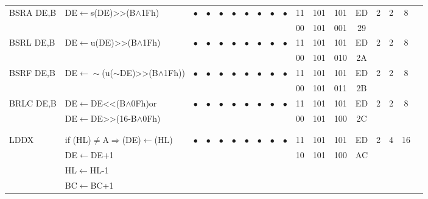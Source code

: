 \documentclass[oneside,a4paper]{book}
\newcommand{\instrt}{\rule{0pt}{2.7ex}}
\newcommand{\instrb}{\rule[-1.7ex]{0pt}{0pt}}
\begin{document}
{\begin{tabular}{llcccccccccccccccl}
		BSRA DE,B\instrt & 
			DE$\leftarrow$s(DE)>>(B$\wedge$1Fh)\footnotemark[2] & 
			$\bullet$ & 
				$\bullet$ & 
				$\bullet$ & 
				$\bullet$ & 
				$\bullet$ & 
				$\bullet$ & 
				$\bullet$ & 
				$\bullet$ & 
			11 & 101 & 101 & 
			ED & 2 & 
			2 & 8 & \\
			\multicolumn{10}{c}{} & 00 & 101 & 001 & 29 & \instrb \\

		BSRL DE,B\instrt & 
			DE$\leftarrow$u(DE)>>(B$\wedge$1Fh)\footnotemark[3] & 
			$\bullet$ & 
				$\bullet$ & 
				$\bullet$ & 
				$\bullet$ & 
				$\bullet$ & 
				$\bullet$ & 
				$\bullet$ & 
				$\bullet$ & 
			11 & 101 & 101 & 
			ED & 2 & 
			2 & 8 & \\
			\multicolumn{10}{c}{} & 00 & 101 & 010 & 2A & \instrb \\

		BSRF DE,B\instrt & 
			DE$\leftarrow\sim$(u($\sim$DE)>>(B$\wedge$1Fh))\footnotemark[4] & 
			$\bullet$ & 
				$\bullet$ & 
				$\bullet$ & 
				$\bullet$ & 
				$\bullet$ & 
				$\bullet$ & 
				$\bullet$ & 
				$\bullet$ & 
			11 & 101 & 101 & 
			ED & 2 & 
			2 & 8 & \\
			\multicolumn{10}{c}{} & 00 & 101 & 011 & 2B & \instrb \\
			
		BRLC DE,B\instrt & 
			DE$\leftarrow$DE<<(B$\wedge$0Fh)\footnotemark[5] or & 
			$\bullet$ & 
				$\bullet$ & 
				$\bullet$ & 
				$\bullet$ & 
				$\bullet$ & 
				$\bullet$ & 
				$\bullet$ & 
				$\bullet$ & 
			11 & 101 & 101 & 
			ED & 2 & 
			2 & 8 & \\
			& DE$\leftarrow$DE>>(16-B$\wedge$0Fh) & \multicolumn{8}{c}{} & 00 & 101 & 100 & 2C & \instrb \\

		& & & & & & & & & & & & & & & & & \\
		& & & & & & & & & & & & & & & & & \\
	
		LDDX\instrt & 
			if (HL)$\neq$A$\Rightarrow$(DE)$\leftarrow$(HL) & 
			$\bullet$ & 
				$\bullet$ & 
				$\bullet$ & 
				$\bullet$ & 
				$\bullet$ & 
				$\bullet$ & 
				$\bullet$ & 
				$\bullet$ & 
			11 & 101 & 101 & 
			ED & 2 & 
			4 & 16 & \\
			& DE$\leftarrow$DE+1 & \multicolumn{8}{c}{} & 10 & 101 & 100 & AC & \\
			& HL$\leftarrow$HL-1 & \\
			& BC$\leftarrow$BC+1 & \instrb \\
	

\end{tabular}}
\end{document}
